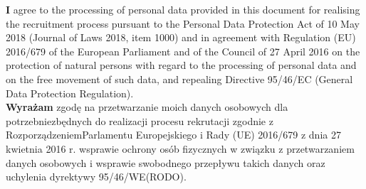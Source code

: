 \documentclass[10pt,a4paper,sans]{moderncv}
\begin{document}
\makecvtitle







\vspace{8cm}

{
  \footnotesize
\textbf{I} agree to the processing of personal data provided in this document for
realising the recruitment process pursuant to the Personal Data Protection Act
of 10 May 2018 (Journal of Laws 2018, item 1000) and in agreement with
Regulation (EU) 2016/679 of the European Parliament and of the Council of 27
April 2016 on the protection of natural persons with regard to the processing
of personal data and on the free movement of such data, and repealing Directive
95/46/EC (General Data Protection Regulation).\\
}
{
  \footnotesize 
  \textbf{Wyrażam} zgodę na przetwarzanie moich danych osobowych dla potrzebniezbędnych do realizacji procesu rekrutacji zgodnie z RozporządzeniemParlamentu Europejskiego i Rady (UE) 2016/679 z dnia 27 kwietnia 2016 r. wsprawie ochrony osób fizycznych w związku z przetwarzaniem danych osobowych i wsprawie swobodnego przepływu takich danych oraz uchylenia dyrektywy 95/46/WE(RODO).
}

\clearpage
\end{document}
